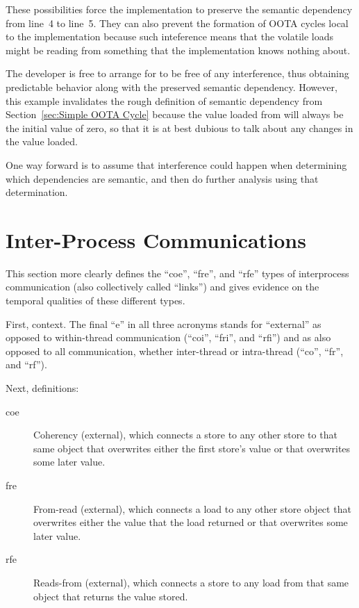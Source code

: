 \documentclass[10]{article}
\begin{document}
These possibilities force the implementation to preserve the semantic
dependency from line~4 to line~5.
They can also prevent the formation of OOTA cycles local to the
implementation because such inteference means that the volatile loads
might be reading from something that the implementation knows nothing
about.

The developer is free to arrange for  to be free of any
interference, thus obtaining predictable behavior along with the
preserved semantic dependency.
However, this example invalidates the rough definition of semantic
dependency from
Section~\ref{sec:Simple OOTA Cycle}
because the value loaded from  will always be the initial value
of zero, so that it is at best dubious to talk about any changes in
the value loaded.

One way forward is to assume that interference could happen when
determining which dependencies are semantic, and then do further analysis
using that determination.

\clearpage

\section{Inter-Process Communications}
\label{app:Inter-Process Communications}

This section more clearly defines the ``coe'', ``fre'', and ``rfe''
types of interprocess communication (also collectively called ``links'')
and gives evidence on the temporal qualities of these different types.

First, context.
The final ``e'' in all three acronyms stands for ``external'' as opposed
to within-thread communication (``coi'', ``fri'', and ``rfi'') and as
also opposed to all communication, whether inter-thread or intra-thread
(``co'', ``fr'', and ``rf'').

Next, definitions:

\begin{description}
\item[coe]
	Coherency (external), which connects a store to any other store
	to that same object that overwrites either the first store's
	value or that overwrites some later value.
\item[fre]
	From-read (external), which connects a load to any other store
	object that overwrites either the value that the load returned
	or that overwrites some later value.
\item[rfe]
	Reads-from (external), which connects a store to any load from
	that same object that returns the value stored.
\end{description}
\end{document}
